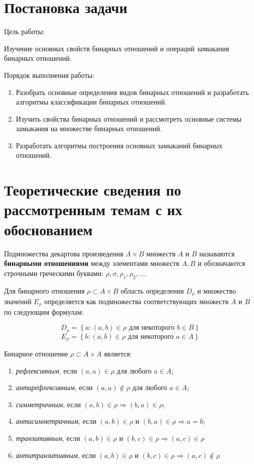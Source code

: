 \documentclass[spec, och, labwork]{shiza}
\begin{document}
\tableofcontents

\section{Постановка задачи}

Цель работы:

Изучение основных свойств бинарных отношений и операций замыкания бинарных отношений.

Порядок выполнения работы:
    \begin{enumerate}
        \item Разобрать основные определения видов бинарных отношений и разработать
        алгоритмы классификации бинарных отношений.
        \item Изучить свойства бинарных отношений и рассмотреть основные системы
        замыкания на множестве бинарных отношений.
        \item Разработать алгоритмы построения основных замыканий бинарных отношений.
    \end{enumerate}

\section{Теоретические сведения по рассмотренным темам с их обоснованием}
        
        Подмножества декартова произведения $A \times B$ множеств $A$ и $B$ называются \textbf{бинарными отношениями} между элементами множеств $A, B$ и обозначаются строчными греческими буквами: $\rho, \sigma, \rho_1, \rho_2, ...$. 

        Для бинарного отношения $\rho \subset A \times B$ область определения $D_\rho$ и множество значений $E_\rho$ определяется как подмножества соответствующих множеств $A$ и $B$ по следующим формулам:

        \[D_\rho = \left\{ a: (a, b) \in \rho \text{ для некоторого } b \in B \right\}\]
        \[E_\rho = \left\{ b: (a, b) \in \rho \text{ для некоторого } a \in A \right\}\]

        Бинарное отношение $\rho \subset A \times A$ является:

        \begin{enumerate}
            \item \textit{рефлексивным}, если $(a, a) \in \rho$ для любого $a \in A$;
            \item \textit{антирефлексивным}, если $(a, a) \notin \rho$ для любого $a \in A$;
            \item \textit{симметричным}, если $(a, b) \in \rho \Rightarrow (b, a) \in \rho$;
            \item \textit{антисимметричным}, если $(a, b) \in \rho \text{ и } (b, a) \in \rho \Rightarrow a = b$;
            \item \textit{транзитивным}, если $(a, b) \in \rho \text{ и } (b, c) \in \rho \Rightarrow (a, c) \in \rho$
            \item \textit{антитранзитивным}, если $(a, b) \in \rho \text{ и } (b, c) \in \rho \Rightarrow (a, c) \notin \rho$
        \end{enumerate}
\end{document}
